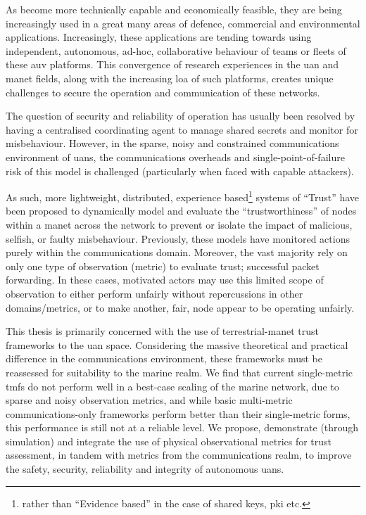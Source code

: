 As  become more technically capable and economically feasible, they are being increasingly used in a great many areas of defence, commercial and environmental applications. 
Increasingly, these applications are tending towards using independent, autonomous, ad-hoc, collaborative behaviour of teams or fleets of these \gls{auv} platforms.
This convergence of research experiences in the \acrfull{uan} and \gls{manet} fields, along with the increasing \gls{loa} of such platforms, creates unique challenges to secure the operation and communication of these networks.

The question of security and reliability of operation has usually been resolved by having a centralised coordinating agent to manage shared secrets and monitor for misbehaviour.
However, in the sparse, noisy and constrained communications environment of \glspl{uan}, the communications overheads and single-point-of-failure risk of this model is challenged (particularly when faced with capable attackers).

As such, more lightweight, distributed, experience based\footnote{rather than ``Evidence based'' in the case of shared keys, \gls{pki} etc.} systems of ``Trust'' have been proposed to dynamically model and evaluate the ``trustworthiness'' of nodes within a \gls{manet} across the network to prevent or isolate the impact of malicious, selfish, or faulty misbehaviour. 
Previously, these models have monitored actions purely within the communications domain. 
Moreover, the vast majority rely on only one type of observation (metric) to evaluate trust; successful packet forwarding.
In these cases, motivated actors may use this limited scope of observation to either perform unfairly without repercussions in other domains/metrics, or to make another, fair, node appear to be operating unfairly.

This thesis is primarily concerned with the use of terrestrial-\gls{manet} trust frameworks to the \gls{uan} space. 
Considering the massive theoretical and practical difference in the communications environment, these frameworks must be reassessed for suitability to the marine realm. 
We find that current single-metric \glspl{tmf} do not perform well in a best-case scaling of the marine network, due to sparse and noisy observation metrics, and while basic multi-metric communications-only frameworks perform better than their single-metric forms, this performance is still not at a reliable level. 
We propose, demonstrate (through simulation) and integrate the use of physical observational metrics for trust assessment, in tandem with metrics from the communications realm, to improve the safety, security, reliability and integrity of autonomous \glspl{uan}.

